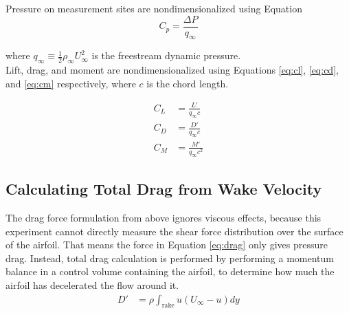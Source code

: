 \documentclass[runningheads]{llncs}
\begin{document}
Pressure on measurement sites are nondimensionalized using Equation
\begin{equation}
    C_p = \frac{\Delta P}{q_\infty}
    \label{eq:cp}
\end{equation}

where $q_\infty\equiv\frac{1}{2}\rho_\infty U_\infty^2$ is the freestream dynamic pressure.\\

Lift, drag, and moment are nondimensionalized using Equations \ref{eq:cl}, \ref{eq:cd}, and \ref{eq:cm} respectively, where $c$ is the chord length.

\begin{align}
    C_L &= \frac{L'}{q_\infty c}
    \label{eq:cl}\\
    C_D &= \frac{D'}{q_\infty c}
    \label{eq:cd}\\
    C_M &= \frac{M'}{q_\infty c^2}
    \label{eq:cm}
\end{align}

\subsection{Calculating Total Drag from Wake Velocity}
The drag force formulation from above ignores viscous effects, because this experiment cannot directly measure the shear force distribution over the surface of the airfoil. That means the force in Equation \ref{eq:drag} only gives pressure drag. Instead, total drag calculation is performed by performing a momentum balance in a control volume containing the airfoil, to determine how much the airfoil has decelerated the flow around it.
\begin{align}
    D' &= \rho\int_{\text{rake}} u (U_\infty - u) dy \label{eq:wake_drag}
\end{align}
\end{document}
